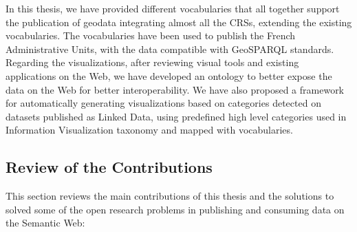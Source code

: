 \documentclass[a4paper,11pt,twoside]{report}
\begin{document}
In this thesis, we have provided different vocabularies that all together support the publication of geodata integrating almost all the CRSs, extending the existing vocabularies. The vocabularies have been used to publish the French Administrative Units, with the data compatible with GeoSPARQL standards. Regarding the visualizations, after reviewing visual tools and existing applications on the Web, we have developed an ontology to better expose the data on the Web for better interoperability. We have also proposed a framework for  automatically generating visualizations based on categories detected on datasets published as Linked Data, using predefined high level categories used in Information Visualization taxonomy and mapped with vocabularies. 

\subsection*{Review of the Contributions}
This section reviews the main contributions of this thesis and the solutions to solved some of the open research problems in publishing and consuming data on the Semantic Web:
\end{document}
